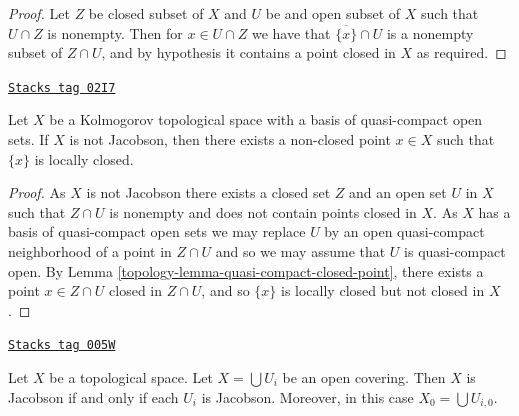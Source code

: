 \begin{proof}
Let $Z$ be closed subset of $X$
and $U$ be and open subset of $X$
such that $U\cap Z$ is nonempty.
Then for $x\in U\cap Z$ we have that $\overline{\{x\}}\cap U$ is a nonempty
subset of $Z\cap U$,
and by hypothesis it contains a point closed in $X$ as required.
\end{proof}

\begin{lemma}
\label{topology-lemma-non-jacobson-Noetherian-characterize}
\href{https://stacks.math.columbia.edu/tag/02I7}{\texttt{Stacks tag 02I7}}

Let $X$ be a Kolmogorov topological space with a basis of quasi-compact
open sets.
If $X$ is not Jacobson, then there exists a non-closed point
$x \in X$ such that $\{x\}$ is locally closed.
\end{lemma}

\begin{proof}

As $X$ is not Jacobson there exists a closed set $Z$ and an open set $U$
in $X$ such that $Z \cap U$ is nonempty and does not contain points closed
in $X$. As $X$ has a basis of quasi-compact open sets we may replace $U$
by an open quasi-compact neighborhood of a point in $Z\cap U$ and so we may
assume that $U$ is quasi-compact open. By
Lemma \ref{topology-lemma-quasi-compact-closed-point}, there exists a point
$x \in Z \cap U$ closed in $Z \cap U$,
and so $\{x\}$ is locally closed but not closed in $X$.
\end{proof}

\begin{lemma}
\label{topology-lemma-jacobson-local}
\href{https://stacks.math.columbia.edu/tag/005W}{\texttt{Stacks tag 005W}}

Let $X$ be a topological space.
Let $X = \bigcup U_i$ be an open covering.
Then $X$ is Jacobson if and only if each $U_i$ is Jacobson.
Moreover, in this case $X_0 = \bigcup U_{i, 0}$.
\end{lemma}

